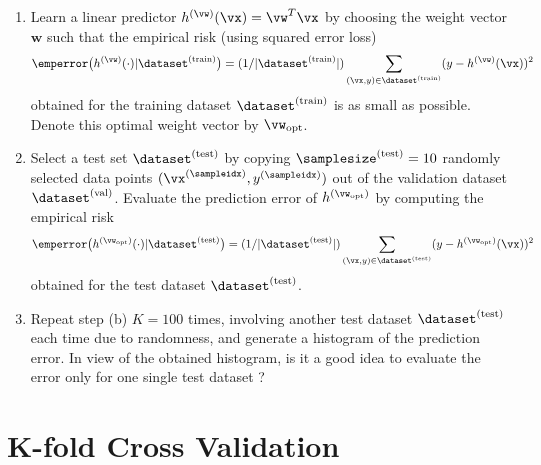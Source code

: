 \documentclass[article,11pt]{article}
\begin{document}
\begin{enumerate}
	\item %
	Learn a linear predictor $h^{(\vw)}(\vx)=\vw^{T} \vx$ by choosing the weight vector $\mathbf{w}$ such that the empirical risk (using squared error loss)
\begin{equation} 
\emperror \big( h^{(\vw)}(\cdot)| \dataset^{(\rm train)} \big) = (1/|\dataset^{(\rm train)}|) \sum_{(\vx,y) \in \dataset^{(\rm train)}} (y - h^{(\vw)}(\vx))^{2}   \nonumber
\end{equation} 
obtained for the training dataset $\dataset^{(\rm train)}$ is as small as possible. Denote this optimal weight vector by $\vw_{\rm opt}$.
	\item Select a test set $\dataset^{(\rm test)}$ by copying $\samplesize^{(\rm test)}= 10$ randomly selected 
	data points $(\vx^{(\sampleidx)},y^{(\sampleidx)})$ out of the validation dataset $\dataset^{(\rm val)}$. 
	Evaluate the prediction error of $h^{(\vw_{\rm opt})}$ by computing the empirical risk 
\begin{equation} 
\emperror \big( h^{(\vw_{\rm opt})}(\cdot)| \dataset^{(\rm test)} \big) = (1/|\dataset^{(\rm test)}|) \sum_{(\vx,y) \in \dataset^{(\rm test)}} (y - h^{(\vw_{\rm opt})}(\vx))^{2}   \nonumber
\end{equation} 	
	obtained for the test dataset $\dataset^{(\rm test)}$.
	\item Repeat step (b) $K = 100$ times, involving another test dataset  $\dataset^{(\rm test)}$ each time due to randomness, 
	and generate a histogram of the prediction error. In view of the obtained histogram, is it a good idea to evaluate the 
	error only for one single test dataset ?  
\end{enumerate}
	

\newpage
\section{K-fold Cross Validation}
\end{document}
